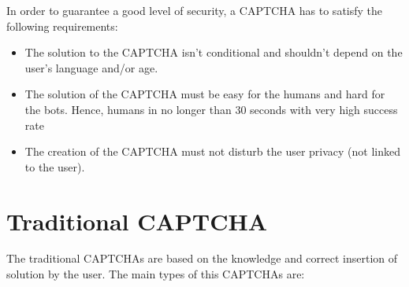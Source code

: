 In order to guarantee a good level of security, a CAPTCHA has to satisfy the following requirements:
\begin{itemize}
\item{The solution to the CAPTCHA isn't conditional and shouldn't depend on the user's language and/or age.}
\item{The solution of the CAPTCHA must be easy for the humans and hard for the bots. Hence, humans in no longer than 30 seconds with very high success rate}
\item{The creation of the CAPTCHA must not disturb the user privacy (not linked to the user).}
\end{itemize}

\section{Traditional CAPTCHA}
The traditional CAPTCHAs are based on the knowledge and correct insertion of solution by the user. The main types of this CAPTCHAs are: 
